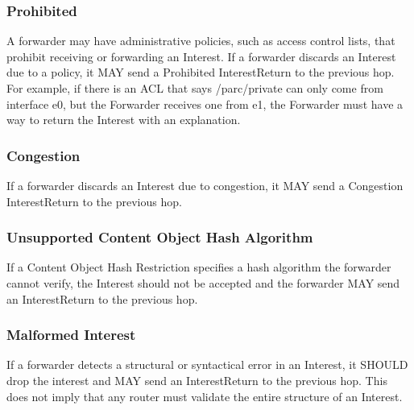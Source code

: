 \documentclass[12pt]{article}
\begin{document}
\subsubsection{Prohibited}
A forwarder may have administrative policies, such as access control
lists, that prohibit receiving or forwarding an Interest.  If a
forwarder discards an Interest due to a policy, it MAY send a
Prohibited InterestReturn to the previous hop.  For example, if there
is an ACL that says /parc/private can only come from interface e0,
but the Forwarder receives one from e1, the Forwarder must have a way
to return the Interest with an explanation.

\subsubsection{Congestion}
If a forwarder discards an Interest due to congestion, it MAY send a
Congestion InterestReturn to the previous hop.

\subsubsection{Unsupported Content Object Hash Algorithm}
If a Content Object Hash Restriction specifies a hash algorithm the
forwarder cannot verify, the Interest should not be accepted and the
forwarder MAY send an InterestReturn to the previous hop.

\subsubsection{Malformed Interest}
If a forwarder detects a structural or syntactical error in an
Interest, it SHOULD drop the interest and MAY send an InterestReturn
to the previous hop.  This does not imply that any router must
validate the entire structure of an Interest.



\end{document}
